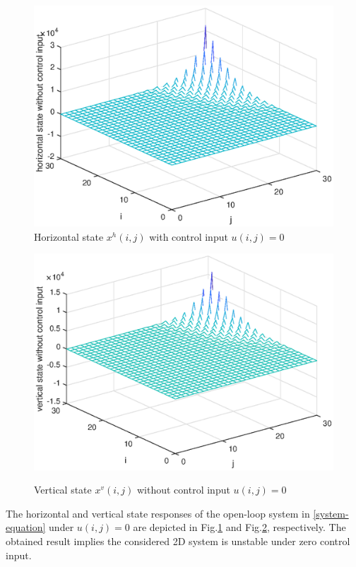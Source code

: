 \documentclass[conference]{IEEEtran}
\begin{document}
\begin{figure}[!htb]
\centering\includegraphics[scale=0.6]{./simulations/hx-no-controll-input.eps}
\caption{ Horizontal state $x^{h}(i,j)$ with control input $u(i,j)=0$}
\label{fig3}
\end{figure}
\begin{figure}[!htb]
\centering\includegraphics[scale=0.6]{./simulations/vx-no-controll-input.eps}\\ 
\caption{Vertical state $x^{v}(i,j)$ without control input $u(i,j)=0$}
\label{fig4}
\end{figure}
 The horizontal and vertical state responses of the open-loop system in \eqref{system-equation} under $u(i,j) = 0$ are depicted in Fig.\ref{fig3} and Fig.\ref{fig4}, respectively. The obtained result implies the considered 2D system is unstable under zero control input. 
\end{document}
